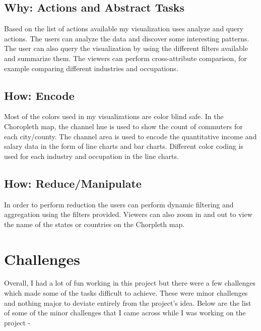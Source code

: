 \documentclass[12pt]{article}
\begin{document}
\subsection{Why: Actions and Abstract Tasks}

Based on the list of actions available my visualization uses analyze and query actions. The users can analyze the data and discover some interesting patterns. The user can also query the visualization by using the different filters available and summarize them. The viewers can perform cross-attribute comparison, for example comparing different industries and occupations.

\subsection{How: Encode}
 
Most of the colors used in my visualizations are color blind safe. In the Choropleth map, the channel hue is used to show the count of commuters for each city/county. The channel area is used to encode the quantitative income and salary data in the form of line charts and bar charts. Different color coding is used for each industry and occupation in the line charts.

\subsection{How: Reduce/Manipulate}

In order to perform reduction the users can perform dynamic filtering and aggregation using the filters provided. Viewers can
also zoom in and out to view the name of the states or countries on the Chorpleth map.

\newpage

\section{Challenges}
Overall, I had a lot of fun working in this project but there were a few challenges which made some of the tasks difficult to achieve. These were minor challenges and nothing major to deviate entirely from the project's idea. Below are the list of some of the minor challenges that I came across while I was working on the project - 
\end{document}
